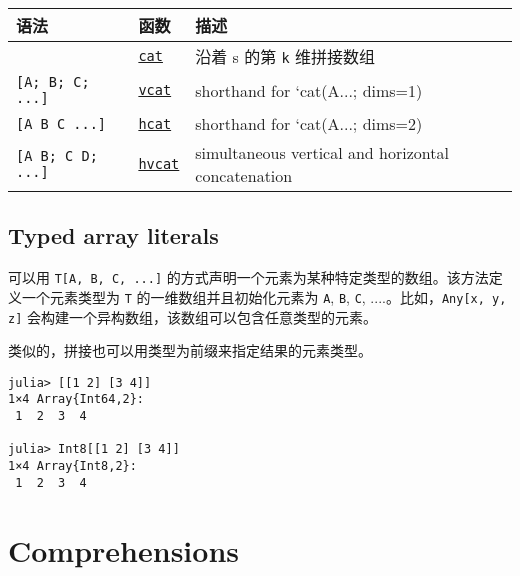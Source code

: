 \begin{table}[h]

\begin{tabulary}{\linewidth}{|L|L|L|}
\hline
语法 & 函数 & 描述 \\
\hline
 & \hyperlink{9868138443525443234}{\texttt{cat}} & 沿着 s 的第 \texttt{k} 维拼接数组 \\
\hline
\texttt{[A; B; C; ...]} & \hyperlink{14691815416955507876}{\texttt{vcat}} & shorthand for `cat(A...; dims=1) \\
\hline
\texttt{[A B C ...]} & \hyperlink{8862791894748483563}{\texttt{hcat}} & shorthand for `cat(A...; dims=2) \\
\hline
\texttt{[A B; C D; ...]} & \hyperlink{16279083053557795116}{\texttt{hvcat}} & simultaneous vertical and horizontal concatenation \\
\hline
\end{tabulary}

\end{table}



\hypertarget{7617457072899643427}{}


\subsection{Typed array literals}



可以用 \texttt{T[A, B, C, ...]} 的方式声明一个元素为某种特定类型的数组。该方法定义一个元素类型为 \texttt{T} 的一维数组并且初始化元素为 \texttt{A}, \texttt{B}, \texttt{C}, ....。比如，\texttt{Any[x, y, z]} 会构建一个异构数组，该数组可以包含任意类型的元素。



类似的，拼接也可以用类型为前缀来指定结果的元素类型。




\begin{verbatim}
julia> [[1 2] [3 4]]
1×4 Array{Int64,2}:
 1  2  3  4

julia> Int8[[1 2] [3 4]]
1×4 Array{Int8,2}:
 1  2  3  4
\end{verbatim}



\hypertarget{12661687782855472919}{}


\section{Comprehensions}



